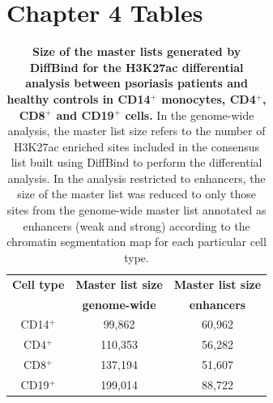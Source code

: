 \clearpage


\section{Chapter 4 Tables}

\begin{table}[htbp]
\centering
\begin{tabular}{@{} c c c}
\toprule
\textbf{Cell type}   & \textbf{Master list size}      & \textbf{Master list size}      \\
                     & \textbf{genome-wide}           & \textbf{enhancers}     \\
\midrule
\midrule
CD14$^+$             & 99,862                  & 60,962                                \\
CD4$^+$              & 110,353                 & 56,282																	\\
CD8$^+$              & 137,194                 & 51,607                                 \\ 
CD19$^+$             & 199,014                 & 88,722                               \\
\bottomrule 
\end{tabular}
\medskip %
\caption[Size of the master lists generated by DiffBind for the H3K27ac differential analysis between psoriasis patients and healthy controls in CD14$^+$ monocytes, CD4$^+$, CD8$^+$ and CD19$^+$ cells.]{\textbf{Size of the master lists generated by DiffBind for the H3K27ac differential analysis between psoriasis patients and healthy controls in CD14$^+$ monocytes, CD4$^+$, CD8$^+$ and CD19$^+$ cells.} In the genome-wide analysis, the master list size refers to the number of H3K27ac enriched sites included in the consensus list built using DiffBind to perform the differential analysis. In the analysis restricted to enhancers, the size of the master list was reduced to only those sites from the genome-wide master list annotated as enhancers (weak and strong) according to the chromatin segmentation map for each particular cell type.}
\label{tab:ChIPm_DiffBind_master_list}
\end{table}
\bigskip %

